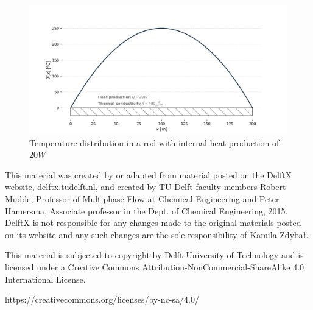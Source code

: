 \documentclass[10pt]{article}
\begin{document}
\begin{figure}[H]
\centering\includegraphics[width=18cm]{temperature_distribution.png}
\caption{Temperature distribution in a rod with internal heat production of $20 W$}
\label{fig:learning_curve}
\end{figure}




\setlength{\parskip}{0.0em}
\setlength{\parindent}{0cm}

\newpage

\thispagestyle{empty}

\vspace*{1cm}

This material was created by or adapted from material posted on the DelftX website, delftx.tudelft.nl, and created by TU Delft faculty members Robert Mudde, Professor of Multiphase Flow at Chemical Engineering and Peter Hamersma, Associate professor in the Dept. of Chemical Engineering, 2015. DelftX is not responsible for any changes made to the original materials posted on its website and any such changes are the sole responsibility of Kamila Zdybał.

This material is subjected to copyright by Delft University of Technology and is licensed under a Creative Commons Attribution-NonCommercial-ShareAlike 4.0 International License.

https://creativecommons.org/licenses/by-nc-sa/4.0/
\end{document}
